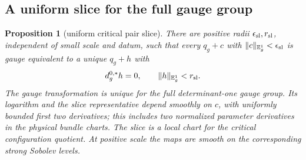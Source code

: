 \documentclass[11pt]{amsart}
\newtheorem{proposition}[theorem]{Proposition}
\theoremstyle{definition}
\theoremstyle{remark}
\theoremstyle{plain}
\begin{document}
\subsection{A uniform slice for the full gauge group}

\begin{proposition}[uniform critical pair slice]\label{prop:pair-slice}
There are positive radii $\epsilon_{\rm sl},r_{\rm sl}$, independent
of small scale and datum, such that every
$q_g+c$ with $\|c\|_{\mathbb E_g^1}<\epsilon_{\rm sl}$
is gauge equivalent to a unique
$q_g+h$ with
\[
 d_g^{0,*}h=0,\qquad \|h\|_{\mathbb E_g^1}<r_{\rm sl}.
\]
The gauge transformation is unique for the full determinant-one gauge
group.  Its logarithm and the slice representative depend smoothly on
$c$, with uniformly bounded first two derivatives; this includes two
normalized parameter derivatives in the physical bundle charts.
The slice is a local chart for the critical configuration quotient.
At positive scale the maps are smooth on the corresponding strong
Sobolev levels.
\end{proposition}
\end{document}
